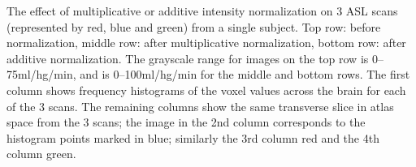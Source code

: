 \label{fig:rgb_figure} The effect of multiplicative or additive intensity normalization on 3 ASL scans (represented by red, blue and green) from a single subject. Top row: before normalization, middle row: after multiplicative normalization, bottom row: after additive normalization. The grayscale range for images on the top row is 0--75ml/hg/min, and is 0--100ml/hg/min for the middle and bottom rows. The first column shows frequency histograms of the voxel values across the brain for each of the 3 scans. The remaining columns show the same transverse slice in atlas space from the 3 scans; the image in the 2nd column corresponds to the histogram points marked in blue; similarly the 3rd column red and the 4th column green. 
